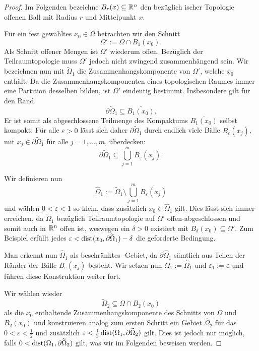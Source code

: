 \begin{proof}
Im Folgenden bezeichne $B_r(x) \subseteq \mathbb{R}^n$ den bezüglich \euklid ischer Topologie offenen Ball mit Radius $r$ und Mittelpunkt $x$.

  Für ein fest gewähltes $x_0 \in \Omega$ betrachten wir den Schnitt 
  $$
  \Omega' := \Omega \cap B_1(x_0).
  $$ 
  Als Schnitt offener Mengen ist $\Omega'$ wiederum offen. 
  Bezüglich der Teilraumtopologie muss $\Omega'$ jedoch nicht zwingend zusammenhängend sein.
  Wir bezeichnen nun mit $\widetilde\Omega_1$ die Zusammenhangskomponente von $\Omega'$, welche $x_0$ enthält.
  Da die Zusammenhangskomponenten eines topologischen Raumes immer eine Partition desselben bilden, ist $\Omega'$ eindeutig bestimmt.
  Insbesondere gilt für den Rand
  $$ 
  \partial \widetilde\Omega_1 \subseteq \overline{B_1(x_0)}.
  $$
  Er ist somit als abgeschlossene Teilmenge des Kompaktums $\overline{B_1(x_0)}$ selbst kompakt.
  Für alle $\varepsilon > 0$ lässt sich daher $\partial \widetilde\Omega_1$ durch endlich viele Bälle $B_\varepsilon(x_j)$, mit $x_j \in \partial \widetilde\Omega_1$ für alle $j = 1,\dots,m$, überdecken:
  $$ 
  \partial \widetilde\Omega_1 \subseteq \bigcup_{j = 1}^m B_\varepsilon(x_j).
  $$

  Wir definieren nun 
  $$
  \widehat\Omega_1 := \widetilde\Omega_1 \setminus \bigcup_{j = 1}^m \overline{B_\varepsilon(x_j)}
  $$
  und wählen $0 < \varepsilon < 1$ so klein, dass zusätzlich $x_0 \in \widehat\Omega_1$ gilt. 
  Dies lässt sich immer erreichen, da $\widetilde\Omega_1$ bezüglich Teilraumtopologie auf $\Omega'$ offen-abgeschlossen und somit auch in $\mathbb{R}^n$ offen ist, weswegen ein $\delta > 0$ existiert mit $B_\delta(x_0) \subseteq \Omega'$.
  Zum Beispiel erfüllt jedes $\varepsilon < \operatorname{dist}(x_0, \partial\widetilde\Omega_1) - \delta$ die geforderte Bedingung.

  Man erkennt nun $\widehat\Omega_1$ als beschränktes \lipschitz\hyp{}Gebiet, da $\partial\widehat\Omega_1$ sämtlich aus Teilen der Ränder der Bälle $B_\varepsilon(x_j)$ besteht.
  Wir setzen nun $\Omega_1 := \widehat\Omega_1$ und $\varepsilon_1 := \varepsilon$ und führen diese Konstruktion weiter fort.

  Wir wählen wieder 
  $$
  \widetilde\Omega_2 \subseteq \Omega \cap B_2(x_0)
  $$
  als die $x_0$ enthaltende Zusammenhangskomponente des Schnitts von $\Omega$ und $B_2(x_0)$ und konstruieren analog zum ersten Schritt ein Gebiet $\widehat\Omega_2$ für das $0 < \varepsilon < \tfrac{1}{2}$ und zusätzlich $\varepsilon < \tfrac{1}{2}\operatorname{dist}(\Omega_1, \partial\widetilde\Omega_2)$ gilt.
  Dies ist jedoch nur möglich, falls $0 < \operatorname{dist}(\Omega_1, \partial\widetilde\Omega_2)$ gilt, was wir im Folgenden beweisen werden.


\end{proof}
